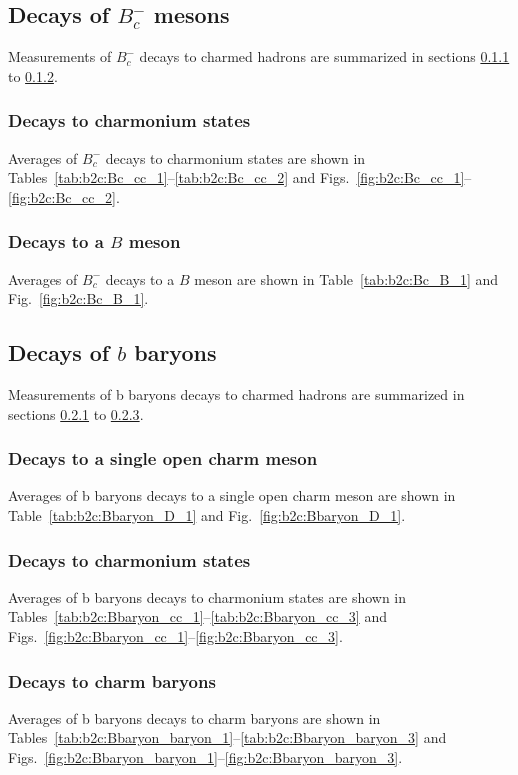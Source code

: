 \subsection{Decays of $B_c^-$ mesons}
\label{sec:b2c:Bc}
Measurements of $B_c^-$ decays to charmed hadrons are summarized in sections \ref{sec:b2c:Bc_cc} to \ref{sec:b2c:Bc_B}.

\subsubsection{Decays to charmonium states}
\label{sec:b2c:Bc_cc}
Averages of $B_c^-$ decays to charmonium states are shown in Tables~\ref{tab:b2c:Bc_cc_1}--\ref{tab:b2c:Bc_cc_2} and Figs.~\ref{fig:b2c:Bc_cc_1}--\ref{fig:b2c:Bc_cc_2}.

\subsubsection{Decays to a $B$ meson}
\label{sec:b2c:Bc_B}
Averages of $B_c^-$ decays to a $B$ meson are shown in Table~\ref{tab:b2c:Bc_B_1} and Fig.~\ref{fig:b2c:Bc_B_1}.


\subsection{Decays of $b$ baryons}
\label{sec:b2c:Bbaryon}
Measurements of b baryons decays to charmed hadrons are summarized in sections \ref{sec:b2c:Bbaryon_D} to \ref{sec:b2c:Bbaryon_baryon}.

\subsubsection{Decays to a single open charm meson}
\label{sec:b2c:Bbaryon_D}
Averages of b baryons decays to a single open charm meson are shown in Table~\ref{tab:b2c:Bbaryon_D_1} and Fig.~\ref{fig:b2c:Bbaryon_D_1}.

\subsubsection{Decays to charmonium states}
\label{sec:b2c:Bbaryon_cc}
Averages of b baryons decays to charmonium states are shown in Tables~\ref{tab:b2c:Bbaryon_cc_1}--\ref{tab:b2c:Bbaryon_cc_3} and Figs.~\ref{fig:b2c:Bbaryon_cc_1}--\ref{fig:b2c:Bbaryon_cc_3}.

\subsubsection{Decays to charm baryons}
\label{sec:b2c:Bbaryon_baryon}
Averages of b baryons decays to charm baryons are shown in Tables~\ref{tab:b2c:Bbaryon_baryon_1}--\ref{tab:b2c:Bbaryon_baryon_3} and Figs.~\ref{fig:b2c:Bbaryon_baryon_1}--\ref{fig:b2c:Bbaryon_baryon_3}.


